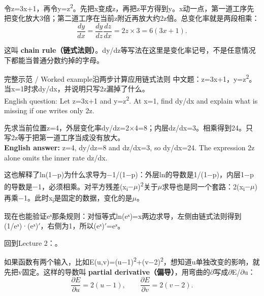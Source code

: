 令z=3x+1，再令y=z\textsuperscript{2}。先把x变成z，再把z平方得到y。x动一点，第一道工序先把变化放大3倍；第二道工序在当前z附近再放大约2z倍。总变化率就是两段相乘：
\[
\frac{dy}{dx}=\frac{dy}{dz}\frac{dz}{dx}=2z\times3=6(3x+1).\tag{M.18}
\]


这叫 \textbf{chain rule（链式法则）}。dy/dz等写法在这里是变化率记号，不是任意情况下都能当普通分数约掉的字母。


\begin{StudyBlock}{完整示范 / Worked example}{沿两步计算应用链式法则}
中文题：z=3x+1，y=z\textsuperscript{2}。当x=1时求dy/dx，并说明只写2z漏掉了什么。\\

English question: Let z=3x+1 and y=z\textsuperscript{2}. At x=1, find dy/dx and explain what is missing if one writes only 2z.


先求当前位置z=4，外层变化率dy/dz=2\ensuremath{\times}4=8；内层dz/dx=3。相乘得到24。只写2z等于把第一道工序当成没有放大。\\

\textbf{English answer:} z=4, dy/dz=8 and dz/dx=3, so dy/dx=24. The expression 2z alone omits the inner rate dz/dx.
\end{StudyBlock}


这也解释了ln(1\ensuremath{-}p)为什么求导为\ensuremath{-}1/(1\ensuremath{-}p)：外层ln的导数是1/(1\ensuremath{-}p)，内层1\ensuremath{-}p的导数是\ensuremath{-}1，必须相乘。对平方残差(x\textsubscript{i}\ensuremath{-}\ensuremath{\mu})\textsuperscript{2}关于\ensuremath{\mu}求导也是同一个套路：2(x\textsubscript{i}\ensuremath{-}\ensuremath{\mu})再乘\ensuremath{-}1。此时x\textsubscript{i}是固定的数据，变化的是\ensuremath{\mu}。


现在也能验证eˣ那条规则：对恒等式ln(eˣ)=x两边求导，左侧由链式法则得到(1/eˣ)·(eˣ)\ensuremath{\prime}，右侧为1，所以(eˣ)\ensuremath{\prime}=eˣ。


回到Lecture 2：。








如果函数有两个输入，比如E(u,v)=(u\ensuremath{-}1)\textsuperscript{2}+(v\ensuremath{-}2)\textsuperscript{2}，想知道u单独改变的影响，就先把v固定。这样的导数叫 \textbf{partial derivative（偏导）}，用弯曲的\ensuremath{\partial}写成\ensuremath{\partial}E/\ensuremath{\partial}u：
\[
\frac{\partial E}{\partial u}=2(u-1),\qquad
\frac{\partial E}{\partial v}=2(v-2).\tag{M.19}
\]


